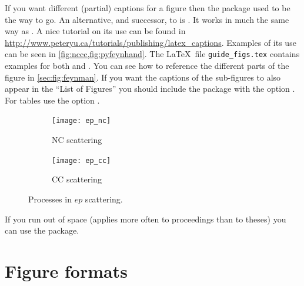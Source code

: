 If you want different (partial) captions for a figure then the
 package used to be the way to go. 
An alternative, and successor, to  is .
It works in much the same way as .
A nice tutorial on its use can be found in
\url{http://www.peteryu.ca/tutorials/publishing/latex_captions}.
Examples of its use can be seen in \cref{fig:nccc,fig:pyfeynhand}.
The \LaTeX\ file \texttt{guide\_figs.tex} contains examples for both  and 
.
You can see how to reference
the different parts of the figure in \cref{sec:fig:feynman}. If
you want the captions of the sub-figures to also appear in the
\enquote{List of Figures} you should include the package with the
option . For tables use the option .


\begin{figure}[htbp]
  \begin{tcblisting}{}
  \centering
  \begin{subfigure}[b]{0.5\figwidth}
    \texttt{[image: ep\_nc]}
    \caption{NC scattering}\label{fig:nccc-nc}
  \end{subfigure}
  \qquad
  \begin{subfigure}[b]{0.5\figwidth}
    \texttt{[image: ep\_cc]}
    \caption{CC scattering}\label{fig:nccc-cc}
  \end{subfigure}
  \end{tcblisting}
  \caption{Processes in $ep$ scattering.}%
  \label{fig:nccc}
\end{figure}

If you run out of space (applies more often to proceedings than to
theses) you can use the  package.


\section{Figure formats}%
\label{sec:fig:formats}

